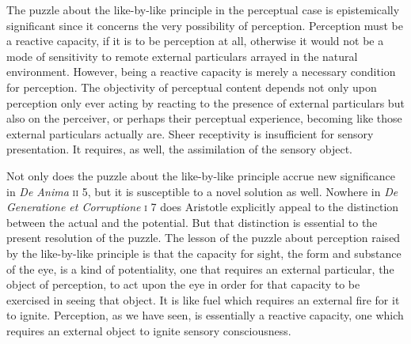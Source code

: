 The puzzle about the like-by-like principle in the perceptual case is epistemically significant since it concerns the very possibility of perception. Perception must be a reactive capacity, if it is to be perception at all, otherwise it would not be a mode of sensitivity to remote external particulars arrayed in the natural environment. However, being a reactive capacity is merely a necessary condition for perception. The objectivity of perceptual content depends not only upon perception only ever acting by reacting to the presence of external particulars but also on the perceiver, or perhaps their perceptual experience, becoming like those external particulars actually are. Sheer receptivity is insufficient for sensory presentation. It requires, as well, the assimilation of the sensory object.

Not only does the puzzle about the like-by-like principle accrue new significance in \emph{De Anima} \textsc{ii} 5, but it is susceptible to a novel solution as well. Nowhere in \emph{De Generatione et Corruptione} \textsc{i} 7 does Aristotle explicitly appeal to the distinction between the actual and the potential. But that distinction is essential to the present resolution of the puzzle. The lesson of the puzzle about perception raised by the like-by-like principle is that the capacity for sight, the form and substance of the eye, is a kind of potentiality, one that requires an external particular, the object of perception, to act upon the eye in order for that capacity to be exercised in seeing that object. It is like fuel which requires an external fire for it to ignite. Perception, as we have seen, is essentially a reactive capacity, one which requires an external object to ignite sensory consciousness.

